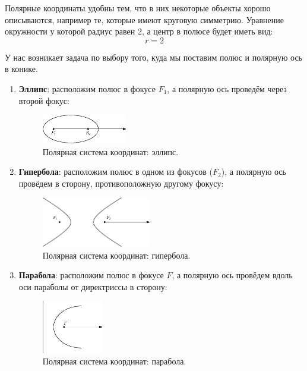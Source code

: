 \documentclass[12pt]{article}
\theoremstyle{definition}
\begin{document}
Полярные координаты удобны тем, что в них некоторые объекты хорошо описываются, например те, которые имеют круговую симметрию. Уравнение окружности у которой радиус равен $2$, а центр в полюсе будет иметь вид: 
$$
	r = 2
$$

У нас возникает задача по выбору того, куда мы поставим полюс и полярную ось в конике.
\begin{enumerate}[label=\arabic*)]
	\item \textbf{Эллипс}: расположим полюс в фокусе $F_1$, а полярную ось проведём через второй фокус:
	\begin{figure}[H]
		\centering
		\includegraphics[width=0.35\textwidth]{ANGL3_13.eps}
		\caption{Полярная система координат: эллипс.}
		\label{3_13}
	\end{figure}
	\item \textbf{Гипербола}: расположим полюс в одном из фокусов ($F_2$), а полярную ось провёдем в сторону, противоположную другому фокусу:
	\begin{figure}[H]
		\centering
		\includegraphics[width=0.45\textwidth]{ANGL3_14.eps}
		\caption{Полярная система координат: гипербола.}
		\label{3_14}
	\end{figure}
	\item \textbf{Парабола}: расположим полюс в фокусе $F$, а полярную ось провёдем вдоль оси параболы от директриссы в сторону:
	\begin{figure}[H]
		\centering
		\includegraphics[width=0.25\textwidth]{ANGL3_15.eps}
		\caption{Полярная система координат: парабола.}
		\label{3_15}
	\end{figure}
\end{enumerate}
\end{document}
